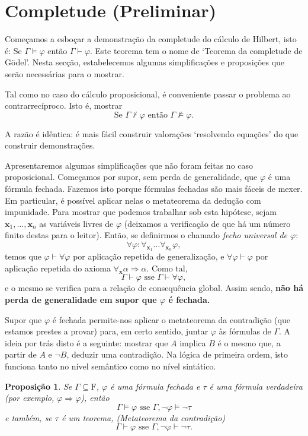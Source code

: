 \documentclass{report}
\newtheorem{prop}{Proposição}
\theoremstyle{definition}
\theoremstyle{remark}
\renewcommand{\bf}[1]{\mathbf{#1}}
\newcommand{\F}{\mathrm{F}}
\newcommand{\imply}{\mathbin{\Rightarrow}}
\begin{document}
	\section{Completude (Preliminar)}
	\setcounter{ideia}{0}
	\setcounter{obstaculo}{0}
	
	Começamos a esboçar a demonstração da completude do cálculo de Hilbert, isto é: Se $\Gamma \vDash \varphi$ então $\Gamma \vdash \varphi$. Este teorema tem o nome de `Teorema da completude de Gödel'. Nesta secção, estabelecemos algumas simplificações e proposições que serão necessárias para o mostrar.
	
	Tal como no caso do cálculo proposicional, é conveniente passar o problema ao contrarrecíproco. Isto é, mostrar
	\[\text{Se } \Gamma \nvdash \varphi \text{ então } \Gamma \nvDash \varphi.\]
	
	A razão é idêntica: é mais fácil construir valorações `resolvendo equações' do que construir demonstrações.
	
	Apresentaremos algumas simplificações que não foram feitas no caso proposicional. Começamos por supor, sem perda de generalidade, que $\varphi$ é uma fórmula fechada. Fazemos isto porque fórmulas fechadas são mais fáceis de mexer. Em particular, é possível aplicar nelas o metateorema da dedução com impunidade. Para mostrar que podemos trabalhar sob esta hipótese, sejam $\bf x_1, \dots, \bf x_n$ as variáveis livres de $\varphi$ (deixamos a verificação de que há um número finito destas para o leitor). Então, se definirmos o chamado \emph{fecho universal de $\varphi$}:
	\[\forall \varphi : \forall_{\bf x_1} \dots \forall_{\bf x_n} \varphi,\]
	temos que $\varphi \vdash \forall \varphi$ por aplicação repetida de generalização, e $\forall \varphi \vdash \varphi$ por aplicação repetida do axioma $\forall_{\bf x} \alpha \imply \alpha$. Como tal,
	\[\Gamma \vdash \varphi \text{ sse } \Gamma \vdash \forall \varphi,\]
	e o mesmo se verifica para a relação de consequência global. Assim sendo, \textbf{não há perda de generalidade em supor que $\varphi$ é fechada.}
	
	Supor que $\varphi$ é fechada permite-nos aplicar o metateorema da contradição (que estamos prestes a provar) para, em certo sentido, juntar $\varphi$ às fórmulas de $\Gamma$. A ideia por trás disto é a seguinte: mostrar que $A$ implica $B$ é o mesmo que, a partir de $A$ e $\neg B$, deduzir uma contradição. Na lógica de primeira ordem, isto funciona tanto no nível semântico como no nível sintático.
	
	\begin{prop}\label{fol:mtc}
	Se $\Gamma \subseteq \F$, $\varphi$ é uma fórmula fechada e $\tau$ é uma fórmula verdadeira (por exemplo, $\varphi \imply \varphi$), então
	\[\Gamma \vDash \varphi \text{ sse } \Gamma, \neg \varphi \vDash \neg \tau\]
	e também, se $\tau$ é um teorema, (Metateorema da contradição)
	\[\Gamma \vdash \varphi \text{ sse } \Gamma, \neg \varphi \vdash \neg \tau.\]
	\end{prop}
	
\end{document}
